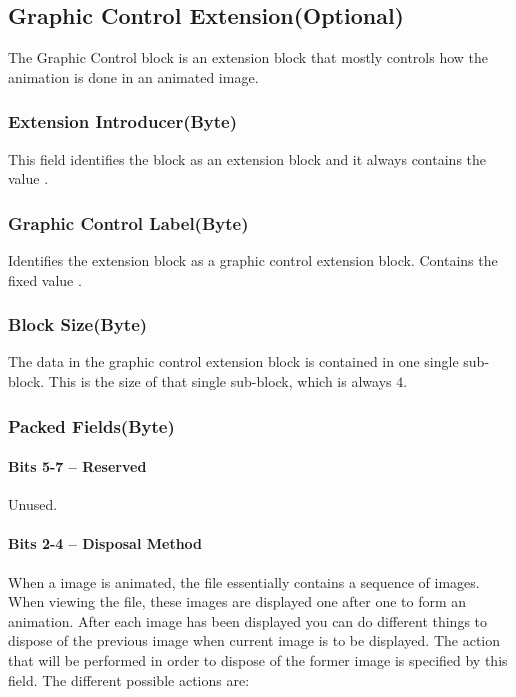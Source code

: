 \subsection{Graphic Control Extension(Optional)}

The Graphic Control block is an extension block that mostly controls
how the animation is done in an animated \gif image.

\subsubsection{Extension Introducer(Byte)}

This field identifies the block as an extension block and it always
contains the value .

\subsubsection{Graphic Control Label(Byte)}

Identifies the extension block as a graphic control extension
block. Contains the fixed value .

\subsubsection{Block Size(Byte)}

The data in the graphic control extension block is contained in one
single sub-block. This is the size of that single sub-block, which is
always $4$.

\subsubsection{Packed Fields(Byte)}

\paragraph{Bits 5-7 -- Reserved}

Unused.

\paragraph{Bits 2-4 -- Disposal Method}

When a \gif image is animated, the file essentially contains a sequence
of images. When viewing the \gif file, these images are displayed one
after one to form an animation. After each image has been displayed
you can do different things to dispose of the previous image when
current image is to be displayed. The action that will be performed in
order to dispose of the former image is specified by this field. The
different possible actions are:

